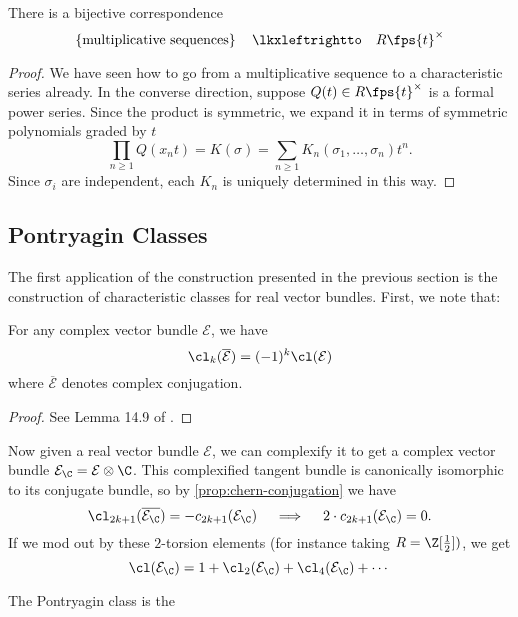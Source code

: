 \begin{theorem}
	There is a bijective correspondence
	\[
		\left\{\parbox{10.5em}{multiplicative sequences}\right\} \quad\lkxleftrightto\quad R\fps{t}^\times
	\]
\end{theorem}
\begin{proof}
	We have seen how to go from a multiplicative sequence to a characteristic series already. In the converse direction, suppose $Q(t)\in R\fps{t}^\times$ is a formal power series. Since the product is symmetric, we expand it in terms of symmetric polynomials graded by $t$
	\[
		 \prod_{n\geq 1} Q(x_n t) = K(\sigma)= \sum_{n\geq 1}K_n(\sigma_1,\ldots, \sigma_n) t^n.
	\]
	Since $\sigma_i$ are independent, each $K_n$ is uniquely determined in this way.
\end{proof}

\subsection{Pontryagin Classes}

The first application of the construction presented in the previous section is the construction of characteristic classes for real vector bundles. First, we note that:
\begin{proposition}\label{prop:chern-conjugation}
	For any complex vector bundle $\mathcal{E}$, we have
	\[
		\cl_k(\overline{\mathcal{E}}) = (-1)^k\cl(\mathcal{E})
	\]
	where $\overline{\mathcal{E}}$ denotes complex conjugation.
\end{proposition}
\begin{proof}
	See Lemma 14.9 of \cite{milnorstasheff1974}.
\end{proof}

Now given a real vector bundle $\mathcal{E}$, we can complexify it to get a complex vector bundle $\mathcal{E}_\C = \mathcal{E}\otimes \C$. This complexified tangent bundle is canonically isomorphic to its conjugate bundle, so by \cref{prop:chern-conjugation} we have
\[
	\cl_{2k+1}(\overline{\mathcal{E}_\C}) = -c_{2k+1}(\mathcal{E}_\C) \quad\implies\quad 2\cdot c_{2k+1}(\mathcal{E}_\C) = 0.
\]
If we mod out by these $2$-torsion elements (for instance taking $R=\Z[\frac{1}{2}])$, we get
\[
	\cl(\mathcal{E}_\C) = 1+\cl_2(\mathcal{E}_\C) + \cl_4(\mathcal{E}_\C)+\cdots
\]
\begin{definition}
	The Pontryagin class is the 
\end{definition}

